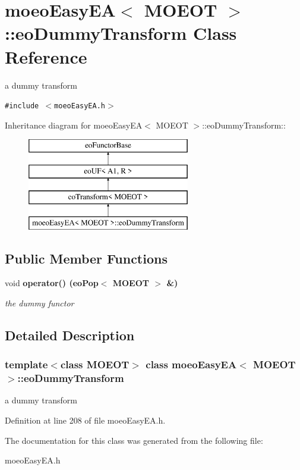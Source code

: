 \section{moeo\-Easy\-EA$<$ MOEOT $>$::eo\-Dummy\-Transform Class Reference}
\label{classmoeoEasyEA_1_1eoDummyTransform}
a dummy transform  


{\tt \#include $<$moeo\-Easy\-EA.h$>$}

Inheritance diagram for moeo\-Easy\-EA$<$ MOEOT $>$::eo\-Dummy\-Transform::\begin{figure}[H]
\begin{center}
\leavevmode
\includegraphics[height=4cm]{classmoeoEasyEA_1_1eoDummyTransform}
\end{center}
\end{figure}
\subsection*{Public Member Functions}
\begin{CompactItemize}
\item 
void \bf{operator()} (\bf{eo\-Pop}$<$ MOEOT $>$ \&)\label{classmoeoEasyEA_1_1eoDummyTransform_0e153e482291a7f19f7f7a02505fb432}

\begin{CompactList}\small\item\em the dummy functor \item\end{CompactList}\end{CompactItemize}


\subsection{Detailed Description}
\subsubsection*{template$<$class MOEOT$>$ class moeo\-Easy\-EA$<$ MOEOT $>$::eo\-Dummy\-Transform}

a dummy transform 



Definition at line 208 of file moeo\-Easy\-EA.h.

The documentation for this class was generated from the following file:\begin{CompactItemize}
\item 
moeo\-Easy\-EA.h\end{CompactItemize}
